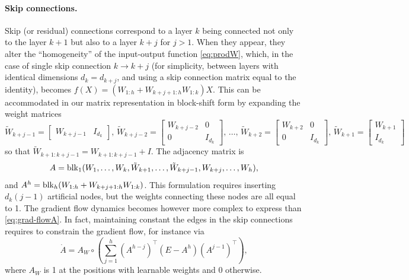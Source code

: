 \documentclass{article}
\def\block{{\rm blk}}
\newcommand{\1}{\mathds{1}}
\begin{document}
\paragraph{Skip connections.}
Skip (or residual) connections correspond to a layer $k$ being connected not only to the layer $ k+1$ but also to a layer $ k+j$ for $ j>1$. 
When they appear, they alter the ``homogeneity'' of the input-output function \eqref{eq:prodW}, which, in the case of single skip connection $ k \to k+j $ (for simplicity, between layers with identical dimensions $ d_k = d_{k+j}$, and using a skip connection matrix equal to the identity), becomes $ f(X)= (W_{1:h}+ W_{k+j+1:h} W_{1:k}) X$.
This can be accommodated in our matrix representation in block-shift form by expanding the weight matrices
\[
    \tilde{W}_{k+j-1} = \begin{bmatrix}
        W_{k+j-1} & I_{d_k}
    \end{bmatrix}, \,
    \tilde{W}_{k+j-2} = \begin{bmatrix}
        W_{k+j-2} & 0 \\ 0 & I_{d_k}
    \end{bmatrix}, \, \ldots, \,
    \tilde{W}_{k+2} = \begin{bmatrix}
        W_{k+2} & 0 \\ 0 & I_{d_k}
    \end{bmatrix}, \,
    \tilde{W}_{k+1} = \begin{bmatrix}
        W_{k+1} \\ I_{d_k}
    \end{bmatrix}
\]
so that $\tilde{W}_{k+1:k+j-1} = W_{k+1:k+j-1} + I$. The adjacency matrix is
\[
A=\block_1 (W_1, \ldots, W_k, \tilde{W}_{k+1}, \ldots, \tilde{W}_{k+j-1}, W_{k+j}, \ldots, W_h),
\]
and $A^h = \block_h(W_{1:h}+ W_{k+j+1:h} W_{1:k})$. This formulation requires inserting $d_k(j-1)$ artificial nodes, but the weights connecting these nodes are all equal to 1.
The gradient flow dynamics becomes however more complex to express than \eqref{eq:grad-flowA}.
In fact, maintaining constant the edges in the skip connections requires to constrain the gradient flow, for instance via
\[
\dot{A} = A_W \circ \left(\sum_{j=1}^h \left(A^{h-j}\right)^\top \left( E - A^h \right) \left( A^{j-1}
 \right) ^\top \right),
 \]
where $A_W$ is 1 at the positions with learnable weights and 0 otherwise.
\end{document}
